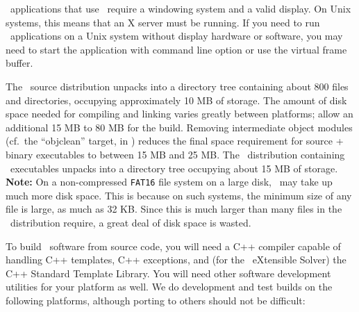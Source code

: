 \OOMMF\ applications that use \Tk\ require a windowing system and
a valid display.  On Unix systems, this means that an X server must
be running.  If you need to run \OOMMF\ applications on a Unix system
without display hardware or software, you may need to start the 
application with command line option 
or use the
virtual frame buffer.

The \OOMMF\ source distribution unpacks into a directory tree containing
about 800 files and directories, occupying approximately 10 MB of
storage.  The amount of disk space needed for compiling and linking
varies greatly between platforms; allow an additional 15 MB to 80 MB for
the build.  Removing intermediate object modules (cf.\ the 
``objclean'' target, in   ) reduces the final space
requirement for source + binary executables to between 15 MB and 25 MB.
The \OOMMF\ distribution containing \Windows\ executables unpacks into a
directory tree occupying about 15 MB of storage.  {\bf Note:} On a
non-compressed {\tt FAT16} file system on a large disk, \OOMMF\ may take
up much more disk space.  This is because on such systems, the minimum
size of any file is large, as much as 32 KB.  Since this is much larger
than many files in the \OOMMF\ distribution require, a great deal of
disk space is wasted.

To build \OOMMF\ software from source code, you will
need a C++ compiler capable of handling
C++ templates, C++ exceptions, and (for the \OOMMF\ eXtensible Solver)
the C++ Standard Template Library.  You will need other software
development utilities for your platform as well.  We do development and
test builds on the following platforms, although porting to others
should not be difficult:

